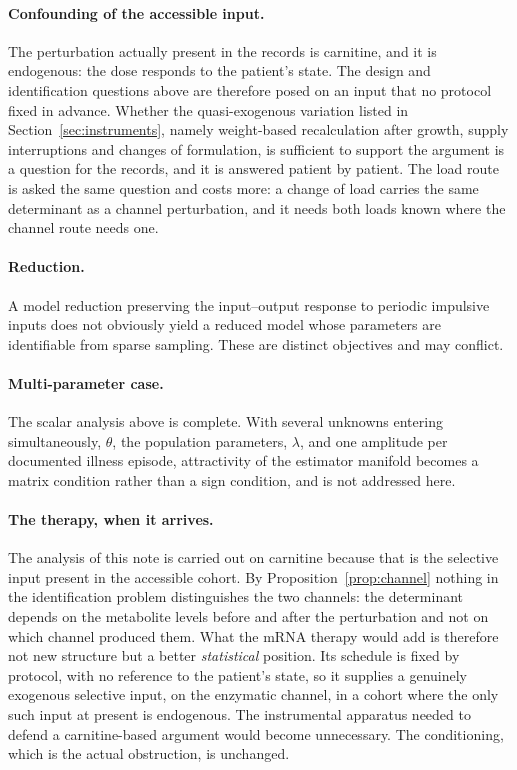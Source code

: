 \paragraph{Confounding of the accessible input.}
\label{sec:confounding}
The perturbation actually present in the
records is carnitine, and it is endogenous: the dose responds to the patient's state. The
design and identification questions above are therefore posed on an input that no protocol
fixed in advance. Whether the quasi-exogenous variation listed in
Section~\ref{sec:instruments}, namely weight-based recalculation after growth, supply
interruptions and changes of formulation, is sufficient to support the argument is a
question for the records, and it is answered patient by patient.
The load route is asked the same question and costs more: a change of load carries the same
determinant as a channel perturbation, and it needs both loads known where the channel
route needs one.

\paragraph{Reduction.} A model reduction preserving the input--output response to periodic
impulsive inputs does not obviously yield a reduced model whose parameters are identifiable
from sparse sampling. These are distinct objectives and may conflict.

\paragraph{Multi-parameter case.} The scalar analysis above is complete. With several
unknowns entering simultaneously, $\theta$, the population parameters, $\lambda$, and one
amplitude per documented illness episode, attractivity of the estimator manifold becomes a
matrix condition rather than a sign condition, and is not addressed here.

\paragraph{The therapy, when it arrives.} The analysis of this note is carried out on
carnitine because that is the selective input present in the accessible cohort. By
Proposition~\ref{prop:channel} nothing in the identification problem distinguishes the two
channels: the determinant depends on the metabolite levels before and after the
perturbation and not on which channel produced them. What the mRNA therapy would add is
therefore not new structure but a better \emph{statistical} position. Its schedule is fixed
by protocol, with no reference to the patient's state, so it supplies a genuinely exogenous
selective input, on the enzymatic channel, in a cohort where the only such input at present
is endogenous. The instrumental apparatus needed to defend a carnitine-based argument would
become unnecessary. The conditioning, which is the actual obstruction, is unchanged.
